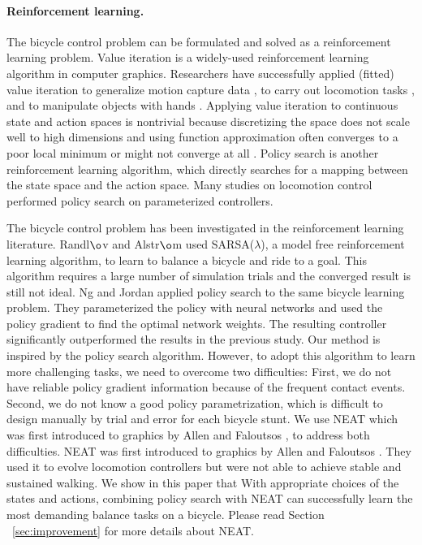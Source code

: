 \paragraph{Reinforcement learning.} The bicycle control problem can be formulated and solved as a reinforcement learning problem. Value iteration is a widely-used reinforcement learning algorithm in computer graphics. Researchers have successfully applied (fitted) value iteration to generalize motion capture data \cite{Treuille:2007:NCA,Levine:2012:CCC}, to carry out locomotion tasks \cite{Coros:2009:RTC}, and to manipulate objects with hands \cite{Multifinger2013}. Applying value iteration to continuous state and action spaces is nontrivial because discretizing the space does not scale well to high dimensions \cite{Sutton:1998:IRL} and using function approximation often converges to a poor local minimum or might not converge at all \cite{Thrun93issuesin,Boyan95generalizationin}. Policy search \cite{Ng:2000:PPS} is another reinforcement learning algorithm, which directly searches for a mapping between the state space and the action space. Many studies on locomotion control \cite{Yin08,Wang:2009,Coros:2011,Tan:2011,Wang:2012,Geijtenbeek:2013} performed policy search on parameterized controllers.

The bicycle control problem has been investigated in the reinforcement learning literature. Randl$\o$v and Alstr$\o$m \cite{RandlovAlstrom:1998} used SARSA($\lambda$), a model free reinforcement learning algorithm, to learn to balance a bicycle and ride to a goal. This algorithm requires a large number of simulation trials and the converged result is still not ideal. Ng and Jordan \cite{Ng:2000:PPS} applied policy search to the same bicycle learning problem. They parameterized the policy with neural networks and used the policy gradient to find the optimal network weights. The resulting controller significantly outperformed the results in the previous study. Our method is inspired by the policy search algorithm. However, to adopt this algorithm to learn more challenging tasks, we need to overcome two difficulties: First, we do not have reliable policy gradient information because of the frequent contact events. Second, we do not know a good policy parametrization, which is difficult to design manually by trial and error for each bicycle stunt. We use NEAT \cite{Stanley:2002:ENN} which was first introduced to graphics by Allen and Faloutsos \cite{Allen2009}, to address both difficulties. NEAT was first introduced to graphics by Allen and Faloutsos \cite{Allen2009}. They used it to evolve locomotion controllers but were not able to achieve stable and sustained walking. We show in this paper that With appropriate choices of the states and actions, combining policy search with NEAT can successfully learn the most demanding balance tasks on a bicycle. Please read Section ~\ref{sec:improvement} for more details about NEAT.

